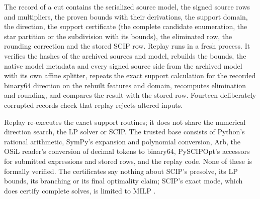 The record of a cut contains the serialized source model, the signed
source rows and multipliers, the proven bounds with their derivations,
the support domain, the direction, the support certificate (the complete
candidate enumeration, the star partition or the subdivision with its
bounds), the eliminated row, the rounding correction and the stored SCIP
row. Replay runs in a fresh process. It verifies the hashes of the
archived sources and model, rebuilds the bounds, the native model metadata
and every signed source side from the archived model with its own affine
splitter, repeats the exact support calculation for the recorded binary64
direction on the rebuilt features and domain, recomputes elimination and
rounding, and compares the result with the stored row. Fourteen
deliberately corrupted records check that replay rejects altered inputs.

Replay re-executes the exact support routines; it does not share the
numerical direction search, the LP solver or SCIP. The trusted base
consists of Python's rational arithmetic, SymPy's expansion and polynomial
conversion, Arb, the OSiL reader's conversion of decimal tokens to
binary64, PySCIPOpt's accessors for submitted expressions and stored rows,
and the replay code. None of these is formally verified. The certificates
say nothing about SCIP's presolve, its LP bounds, its branching or its
final optimality claim; SCIP's exact mode, which does certify complete
solves, is limited to MILP \citep{SCIP10}.
